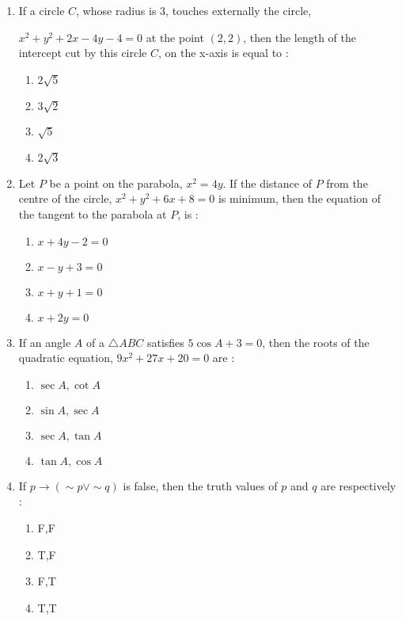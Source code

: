 \documentclass[journal,12pt,twocolumn]{IEEEtran}
\begin{document}
\begin{enumerate}[1.]
\item If a circle $C$, whose radius is $3$, touches externally the circle, 

$x^2+y^2+2x-4y-4=0$ at the point $(2,2)$, then the length of the intercept cut by this circle $C$, on the x-axis is equal to :

\begin{enumerate}[(1)]
 
\item $
2 \sqrt{5}
$

\item $
3 \sqrt{2}
$

\item $
\sqrt{5}
$

\item $
2 \sqrt{3}
$


\end{enumerate}

\item Let $P$ be a point on the parabola, $x^2=4y$. If the distance of $P$ from the centre of the circle, $x^2+y^2+6x+8=0$ is minimum, then the equation of the tangent to the parabola at $P$, is :

\begin{enumerate}[(1)]
 
\item $
x+4y-2=0
$

\item $
x-y+3=0
$

\item $
x+y+1=0
$

\item $
x+2y=0
$


\end{enumerate}

\item If an angle $A$ of a $ \bigtriangleup ABC$ satisfies $ 5 \cos A + 3 =0 $, then the roots of the quadratic equation, $9x^2+27x+20=0$ are :

\begin{enumerate}[(1)]
 
\item $
\sec A , \cot A
$

\item $
\sin A , \sec A
$

\item $
\sec A ,\tan A
$

\item $
\tan A , \cos A
$


\end{enumerate}

\item If $ p \rightarrow ( \sim p \vee \sim q )$ is false, then the truth values of $p$ and $q$ are respectively :

\begin{enumerate}[(1)]
 
\item 
F,F


\item 
T,F


\item 
F,T


\item 
T,T



\end{enumerate}
\end{enumerate}
\end{document}
